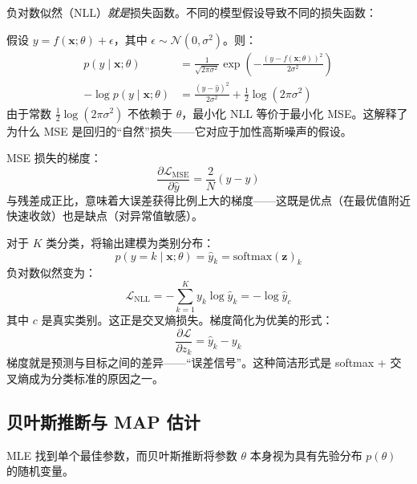 负对数似然（NLL）\emph{就是}损失函数。不同的模型假设导致不同的损失函数：

\begin{示例}
假设 $y = f(\mathbf{x}; \theta) + \epsilon$，其中 $\epsilon \sim \mathcal{N}(0, \sigma^2)$。则：
\begin{align}
p(y \mid \mathbf{x}; \theta) &= \frac{1}{\sqrt{2\pi\sigma^2}} \exp\left(-\frac{(y - f(\mathbf{x};\theta))^2}{2\sigma^2}\right) \\
-\log p(y \mid \mathbf{x}; \theta) &= \frac{(y - \hat{y})^2}{2\sigma^2} + \frac{1}{2}\log(2\pi\sigma^2)
\end{align}
由于常数 $\frac{1}{2}\log(2\pi\sigma^2)$ 不依赖于 $\theta$，最小化 NLL 等价于最小化 MSE。这解释了为什么 MSE 是回归的``自然''损失——它对应于加性高斯噪声的假设。

MSE 损失的梯度：
\begin{equation}
\frac{\partial \mathcal{L}_{\text{MSE}}}{\partial \hat{y}} = \frac{2}{N}(\hat{y} - y)
\end{equation}
与残差成正比，意味着大误差获得比例上大的梯度——这既是优点（在最优值附近快速收敛）也是缺点（对异常值敏感）。
\end{示例}

\begin{示例}
对于 $K$ 类分类，将输出建模为类别分布：
\begin{equation}
p(y = k \mid \mathbf{x}; \theta) = \hat{y}_k = \text{softmax}(\mathbf{z})_k
\end{equation}
负对数似然变为：
\begin{equation}
\mathcal{L}_{\text{NLL}} = -\sum_{k=1}^{K} y_k \log \hat{y}_k = -\log \hat{y}_{c}
\end{equation}
其中 $c$ 是真实类别。这正是交叉熵损失。梯度简化为优美的形式：
\begin{equation}
\frac{\partial \mathcal{L}}{\partial z_k} = \hat{y}_k - y_k
\end{equation}
梯度就是预测与目标之间的差异——``误差信号''。这种简洁形式是 softmax + 交叉熵成为分类标准的原因之一。
\end{示例}

\subsection{贝叶斯推断与 MAP 估计}

MLE 找到单个最佳参数，而贝叶斯推断将参数 $\theta$ 本身视为具有先验分布 $p(\theta)$ 的随机变量。

